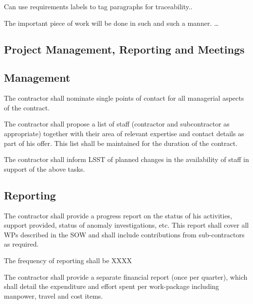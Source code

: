 Can use requirements labels to tag paragraphs for traceability..


         {      \label{req:wp1:sometask}
The important piece of work will be done in such and such a manner. \ldots
 }




\subsection{Project Management, Reporting and Meetings}

\subsection{Management}

         {      \label{req:mngt:spoc}
The contractor shall nominate single points of contact for all managerial aspects of the contract.
}


         {      \label{req:mngt:exp}
The contractor shall propose a list of staff (contractor and subcontractor as appropriate)
together with their area of relevant expertise and contact details as part of his offer. This list
shall be maintained for the duration of the contract.
 }

         {      \label{req:mngt:avail}
The contractor shall inform LSST  of planned changes in the availability of staff in
support of the above tasks.
 }

\subsection{Reporting}
         {      \label{req:mngt:rep}
The contractor shall provide a progress report on the status of his activities, support provided,
status of anomaly investigations, etc. This report shall cover all WPs described in the SOW
and shall include contributions from sub-contractors as required.
 }

         {      \label{req:mngt:repfreq}
The frequency of reporting shall be XXXX 
 }

         {      \label{req:mngt:repfin}
The contractor shall provide a separate financial report (once per quarter), which shall detail
the expenditure and effort spent per work-package including manpower, travel and cost items.
 }

